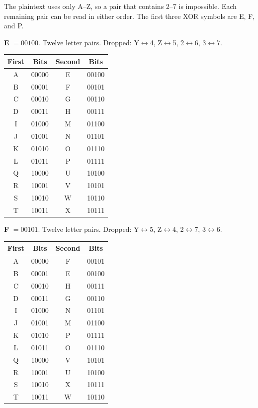 \documentclass[12pt]{article}
\begin{document}
\begin{answer}
    The plaintext uses only A--Z, so a pair that contains 2--7 is impossible. Each remaining pair can be read in either order. The first three XOR symbols are E, F, and P.

    \textbf{E} $=00100$. Twelve letter pairs. Dropped: Y$\leftrightarrow$4, Z$\leftrightarrow$5, 2$\leftrightarrow$6, 3$\leftrightarrow$7.

    \begin{center}
    \small
    \begin{tabular}{c c c c}
    \hline
    First & Bits & Second & Bits \\
    \hline
    A & 00000 & E & 00100 \\
    B & 00001 & F & 00101 \\
    C & 00010 & G & 00110 \\
    D & 00011 & H & 00111 \\
    I & 01000 & M & 01100 \\
    J & 01001 & N & 01101 \\
    K & 01010 & O & 01110 \\
    L & 01011 & P & 01111 \\
    Q & 10000 & U & 10100 \\
    R & 10001 & V & 10101 \\
    S & 10010 & W & 10110 \\
    T & 10011 & X & 10111 \\
    \hline
    \end{tabular}
    \end{center}

    \textbf{F} $=00101$. Twelve letter pairs. Dropped: Y$\leftrightarrow$5, Z$\leftrightarrow$4, 2$\leftrightarrow$7, 3$\leftrightarrow$6.

    \begin{center}
    \small
    \begin{tabular}{c c c c}
    \hline
    First & Bits & Second & Bits \\
    \hline
    A & 00000 & F & 00101 \\
    B & 00001 & E & 00100 \\
    C & 00010 & H & 00111 \\
    D & 00011 & G & 00110 \\
    I & 01000 & N & 01101 \\
    J & 01001 & M & 01100 \\
    K & 01010 & P & 01111 \\
    L & 01011 & O & 01110 \\
    Q & 10000 & V & 10101 \\
    R & 10001 & U & 10100 \\
    S & 10010 & X & 10111 \\
    T & 10011 & W & 10110 \\
    \hline
    \end{tabular}
    \end{center}


\end{answer}
\end{document}
